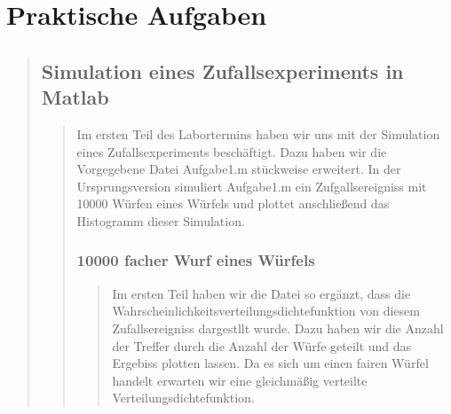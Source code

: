 \section{Praktische Aufgaben}
\begin{quote}
    \subsection{Simulation eines Zufallsexperiments in Matlab}
    \begin{quote}
        Im ersten Teil des Labortermins haben wir uns mit der Simulation eines Zufallsexperiments beschäftigt. Dazu
        haben wir die Vorgegebene Datei Aufgabe1.m stückweise erweitert. In der Ursprungsversion simuliert Aufgabe1.m
        ein Zufgallsereigniss mit 10000 Würfen eines Würfels und plottet anschließend das Histogramm dieser
        Simulation.\\
        
        \subsubsection{10000 facher  Wurf eines Würfels}
		\begin{quote}
        Im ersten Teil haben wir die Datei so ergänzt, dass die Wahrscheinlichkeitsverteilungsdichtefunktion von diesem
        Zufallsereigniss dargestllt wurde. Dazu haben wir die Anzahl der Treffer durch die Anzahl der Würfe geteilt
        und das Ergebiss plotten lassen. Da es sich um einen fairen Würfel handelt erwarten wir eine gleichmäßig
        verteilte Verteilungsdichtefunktion.
		\end{quote}
        

\end{quote}
\end{quote}
